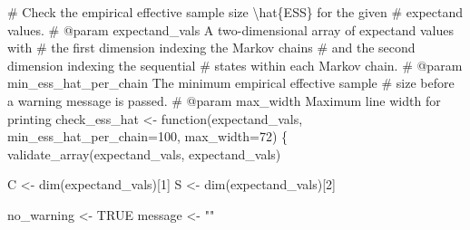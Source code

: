 \documentclass[
  letterpaper,
  DIV=11,
  numbers=noendperiod]{scrartcl}
\newenvironment{Shaded}{\begin{snugshade}}{\end{snugshade}}
\newcommand{\CommentTok}[1]{\textcolor[rgb]{0.37,0.37,0.37}{#1}}
\newcommand{\DecValTok}[1]{\textcolor[rgb]{0.68,0.00,0.00}{#1}}
\newcommand{\NormalTok}[1]{\textcolor[rgb]{0.00,0.23,0.31}{#1}}
\newcommand{\OperatorTok}[1]{\textcolor[rgb]{0.37,0.37,0.37}{#1}}
\newcommand{\StringTok}[1]{\textcolor[rgb]{0.13,0.47,0.30}{#1}}
\begin{document}
\begin{Shaded}
\begin{Highlighting}[]
\CommentTok{\# Check the empirical effective sample size \textbackslash{}hat\{ESS\} for the given}
\CommentTok{\# expectand values.}
\CommentTok{\# @param expectand\_vals A two{-}dimensional array of expectand values with}
\CommentTok{\#                       the first dimension indexing the Markov chains}
\CommentTok{\#                       and the second dimension indexing the sequential}
\CommentTok{\#                       states within each Markov chain.}
\CommentTok{\# @param min\_ess\_hat\_per\_chain The minimum empirical effective sample}
\CommentTok{\#                              size before a warning message is passed.}
\CommentTok{\# @param max\_width Maximum line width for printing}
\NormalTok{check\_ess\_hat }\OperatorTok{\textless{}{-}}\NormalTok{ function(expectand\_vals,}
\NormalTok{                          min\_ess\_hat\_per\_chain}\OperatorTok{=}\DecValTok{100}\NormalTok{,}
\NormalTok{                          max\_width}\OperatorTok{=}\DecValTok{72}\NormalTok{) \{}
\NormalTok{  validate\_array(expectand\_vals, }\StringTok{\textquotesingle{}expectand\_vals\textquotesingle{}}\NormalTok{)}

\NormalTok{  C }\OperatorTok{\textless{}{-}}\NormalTok{ dim(expectand\_vals)[}\DecValTok{1}\NormalTok{]}
\NormalTok{  S }\OperatorTok{\textless{}{-}}\NormalTok{ dim(expectand\_vals)[}\DecValTok{2}\NormalTok{]}
  
\NormalTok{  no\_warning }\OperatorTok{\textless{}{-}}\NormalTok{ TRUE}
\NormalTok{  message }\OperatorTok{\textless{}{-}} \StringTok{""}
  

\end{Highlighting}
\end{Shaded}
\end{document}
